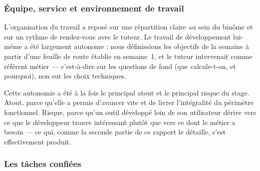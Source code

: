 \documentclass[12pt,a4paper]{article}
\begin{document}
\subsubsection{Équipe, service et environnement de travail}


L'organisation du travail a reposé sur une répartition claire au sein du binôme
et sur un rythme de rendez-vous avec le tuteur. Le travail de développement
lui-même a été largement autonome : nous définissions les objectifs de la semaine
à partir d'une feuille de route établie en semaine~1, et le tuteur intervenait
comme référent métier --- c'est-à-dire sur les questions de fond (que calcule-t-on,
et pourquoi), non sur les choix techniques.

Cette autonomie a été à la fois le principal atout et le principal risque du
stage. Atout, parce qu'elle a permis d'avancer vite et de livrer l'intégralité du
périmètre fonctionnel. Risque, parce qu'un outil développé loin de son
utilisateur dérive vers ce que le développeur trouve intéressant plutôt que vers
ce dont le métier a besoin --- ce qui, comme la seconde partie de ce rapport le
détaille, s'est effectivement produit.

\subsubsection{Les tâches confiées}
\end{document}
